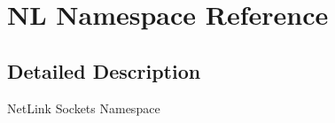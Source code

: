 \hypertarget{namespaceNL}{}\section{N\+L Namespace Reference}
\label{namespaceNL}


\subsection{Detailed Description}
Net\+Link Sockets Namespace 